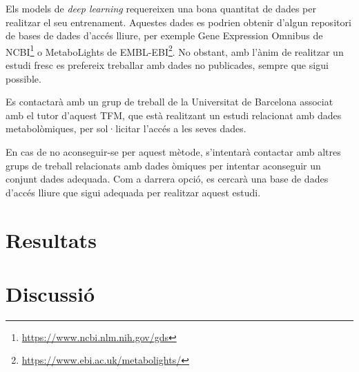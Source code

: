 \documentclass[CAT,BIB]{TFUOC}%
\begin{document}
        Els models de \textit{deep learning} requereixen una bona quantitat de dades per realitzar el seu entrenament. Aquestes dades es podrien obtenir d'algun repositori de bases de dades d'accés lliure, per exemple Gene Expression Omnibus de NCBI\footnote{\url{https://www.ncbi.nlm.nih.gov/gds}} o MetaboLights de EMBL-EBI\footnote{\url{https://www.ebi.ac.uk/metabolights/}}. No obstant, amb l'ànim de realitzar un estudi fresc es prefereix treballar amb dades no publicades, sempre que sigui possible.

        Es contactarà amb un grup de treball de la Universitat de Barcelona associat amb el tutor d'aquest TFM, que està realitzant un estudi relacionat amb dades metabolòmiques, per sol·licitar l'accés a les seves dades.

        En cas de no aconseguir-se per aquest mètode, s'intentarà contactar amb altres grups de treball relacionats amb dades òmiques per intentar aconseguir un conjunt dades adequada. Com a darrera opció, es cercarà una base de dades d'accés lliure que sigui adequada per realitzar aquest estudi.



\chapter{Resultats}

\chapter{Discussió}
\end{document}
